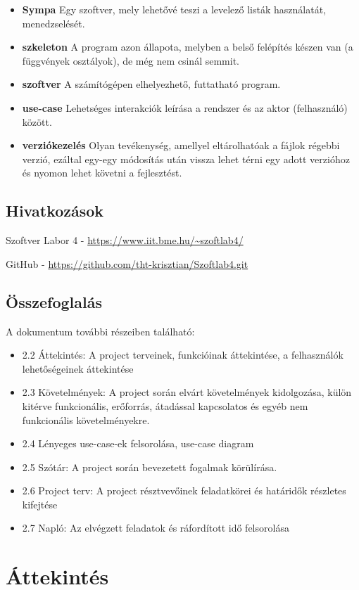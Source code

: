 \begin{itemize}
\item \textbf{Sympa}	Egy szoftver, mely lehetővé teszi a levelező listák használatát, menedzselését.
\item \textbf{szkeleton}	A program azon állapota, melyben a belső felépítés készen van (a függvények osztályok), de még nem csinál semmit.
\item \textbf{szoftver}	A számítógépen elhelyezhető, futtatható program.
\item \textbf{use-case}	Lehetséges interakciók leírása a rendszer és az aktor (felhasználó) között.
\item \textbf{verziókezelés}		Olyan tevékenység, amellyel eltárolhatóak a fájlok régebbi verzió, ezáltal egy-egy módosítás után vissza lehet térni egy adott verzióhoz és nyomon lehet követni a fejlesztést.

\end{itemize}

\subsection {Hivatkozások}
Szoftver Labor 4 - \url{https://www.iit.bme.hu/~szoftlab4/}

GitHub - \url{https://github.com/tht-krisztian/Szoftlab4.git}

\subsection{Összefoglalás}
A dokumentum további részeiben található:
\begin{itemize}
\item 2.2 Áttekintés: A project terveinek, funkcióinak áttekintése, a felhasználók lehetőségeinek áttekintése
\item 2.3 Követelmények: A project során elvárt követelmények kidolgozása, külön kitérve funkcionális, erőforrás, átadással kapcsolatos és egyéb nem funkcionális követelményekre.
\item 2.4 Lényeges use-case-ek felsorolása, use-case diagram
\item 2.5 Szótár: A project során bevezetett fogalmak körülírása.
\item 2.6 Project terv: A project résztvevőinek feladatkörei és határidők részletes kifejtése
\item 2.7 Napló: Az elvégzett feladatok és ráfordított idő felsorolása
\end{itemize}

\pagebreak
\section{Áttekintés}
